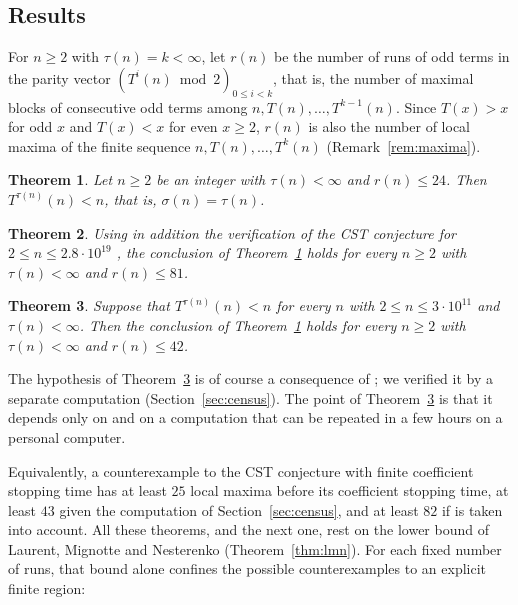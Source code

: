 \documentclass[11pt]{amsart}
\newtheorem{mainthm}{Theorem}
\theoremstyle{definition}
\theoremstyle{remark}
\begin{document}
\subsection*{Results}
For $n\ge2$ with $\tau(n)=k<\infty$, let $r(n)$ be the number of runs of odd terms in the parity vector $(T^{i}(n)\bmod2)_{0\le i<k}$, that is, the number of maximal blocks of consecutive odd terms among $n,T(n),\dots,T^{k-1}(n)$. Since $T(x)>x$ for odd $x$ and $T(x)<x$ for even $x\ge2$, $r(n)$ is also the number of local maxima of the finite sequence $n,T(n),\dots,T^{k}(n)$ (Remark~\ref{rem:maxima}).

\begin{mainthm}\label{thm:A}
Let $n\ge2$ be an integer with $\tau(n)<\infty$ and $r(n)\le24$. Then $T^{\tau(n)}(n)<n$, that is, $\sigma(n)=\tau(n)$.
\end{mainthm}

\begin{mainthm}\label{thm:B}
Using in addition the verification of the CST conjecture for $2\le n\le 2.8\cdot10^{19}$ \cite[Corollary~5.4]{RT26}, the conclusion of Theorem~\ref{thm:A} holds for every $n\ge2$ with $\tau(n)<\infty$ and $r(n)\le81$.
\end{mainthm}

\begin{mainthm}\label{thm:D}
Suppose that $T^{\tau(n)}(n)<n$ for every $n$ with $2\le n\le3\cdot10^{11}$ and $\tau(n)<\infty$. Then the conclusion of Theorem~\ref{thm:A} holds for every $n\ge2$ with $\tau(n)<\infty$ and $r(n)\le42$.
\end{mainthm}

The hypothesis of Theorem~\ref{thm:D} is of course a consequence of \cite[Corollary~5.4]{RT26}; we verified it by a separate computation (Section~\ref{sec:census}). The point of Theorem~\ref{thm:D} is that it depends only on \cite{LMN95} and on a computation that can be repeated in a few hours on a personal computer.

Equivalently, a counterexample to the CST conjecture with finite coefficient stopping time has at least $25$ local maxima before its coefficient stopping time, at least $43$ given the computation of Section~\ref{sec:census}, and at least $82$ if \cite[Corollary~5.4]{RT26} is taken into account. All these theorems, and the next one, rest on the lower bound of Laurent, Mignotte and Nesterenko \cite{LMN95} (Theorem~\ref{thm:lmn}). For each fixed number of runs, that bound alone confines the possible counterexamples to an explicit finite region:
\end{document}
